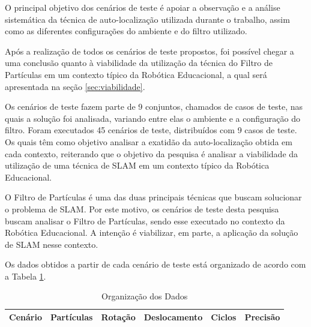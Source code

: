 
O principal objetivo dos cenários de teste é apoiar a observação e a análise sistemática da técnica de auto-localização utilizada durante o trabalho, assim como as diferentes configurações do ambiente e
do filtro utilizado.

Após a realização de todos os cenários de teste propostos, foi possível chegar a uma conclusão quanto à viabilidade da utilização da técnica do Filtro de Partículas em um contexto típico da Robótica Educacional, a qual
será apresentada na seção \ref{sec:viabilidade}.

Os cenários de teste fazem parte de 9 conjuntos, chamados de casos de teste, nas quais a solução foi analisada, variando entre elas o ambiente e a configuração do filtro.
Foram executados 45 cenários de teste, distribuídos com 9 casos de teste. Os quais têm como objetivo analisar a exatidão da
auto-localização obtida em cada contexto, reiterando que o objetivo da pesquisa é analisar a viabilidade da utilização
de uma técnica de SLAM em um contexto típico da Robótica Educacional.

O Filtro de Partículas é uma das duas principais técnicas que buscam solucionar o problema
de SLAM. Por este motivo, os cenários de teste desta pesquisa buscam analisar o Filtro de Partículas, sendo esse executado no contexto da Robótica Educacional.
A intenção é viabilizar, em parte, a aplicação da solução de SLAM nesse contexto.

Os dados obtidos a partir de cada cenário de teste está organizado de acordo com a Tabela \ref{tab:org_dados}.

\begin{table}[H]
  \centering
  \caption{Organização dos Dados}
  \label{tab:org_dados}
  \begin{tabular}{|c|c|c|c|c|c|}
  \hline
  \textbf{Cenário} & \textbf{Partículas} & \textbf{Rotação} & \textbf{Deslocamento} & \textbf{Ciclos} & \textbf{Precisão} \\ \hline
  \end{tabular}
\end{table}

